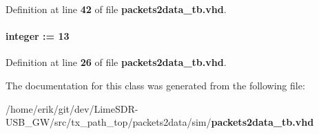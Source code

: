 Definition at line {\bf 42} of file {\bf packets2data\+\_\+tb.\+vhd}.

\paragraph[{smpl\+\_\+nr\+\_\+delay}]{ {\bfseries \textcolor{comment}{integer}\textcolor{vhdlchar}{ }\textcolor{vhdlchar}{ }\textcolor{vhdlchar}{\+:}\textcolor{vhdlchar}{=}\textcolor{vhdlchar}{ }\textcolor{vhdlchar}{ } \textcolor{vhdldigit}{13} \textcolor{vhdlchar}{ }} \hspace{0.3cm}{\ttfamily [Constant]}}\label{classpackets2data__tb_1_1tb__behave_a3ad3bb7316b276692688d9baee9662b8}


Definition at line {\bf 26} of file {\bf packets2data\+\_\+tb.\+vhd}.



The documentation for this class was generated from the following file\+:\begin{DoxyCompactItemize}
\item 
/home/erik/git/dev/\+Lime\+S\+D\+R-\/\+U\+S\+B\+\_\+\+G\+W/src/tx\+\_\+path\+\_\+top/packets2data/sim/{\bf packets2data\+\_\+tb.\+vhd}\end{DoxyCompactItemize}
